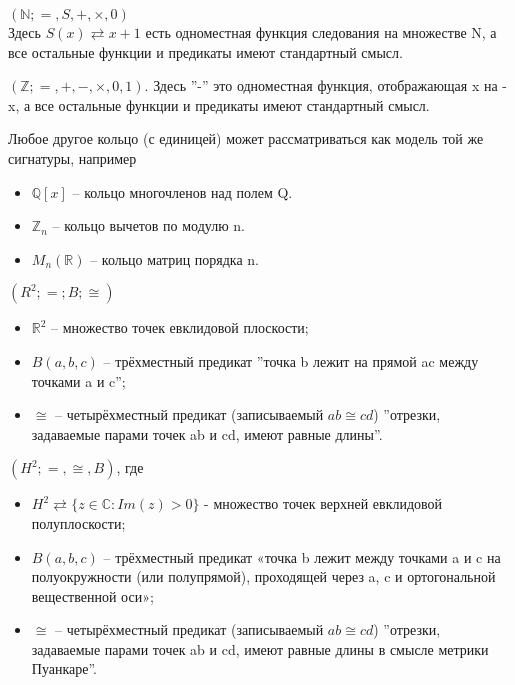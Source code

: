 \begin{example} 
	$(\mathbb{N}; =, S, +, \times, 0)$ \\
	Здесь $S(x) \rightleftarrows x+1 $ есть одноместная функция следования на множестве N,
	а все остальные функции и предикаты имеют стандартный смысл.
\end{example}

\begin{example} 
	$(\mathbb{Z}; =,+,-,\times,0,1)$. Здесь ''-'' это одноместная функция, отображающая x на -x, а все остальные
	функции и предикаты имеют стандартный смысл.
\end{example}

\begin{example} 
	Любое другое кольцо (с единицей) может рассматриваться как
	модель той же сигнатуры, например
	\begin{itemize}
		\item $\mathbb{Q}[x]$ -- кольцо многочленов над полем Q.
		\item $\mathbb{Z}_{n}$ -- кольцо вычетов по модулю n.
		\item $M_{n}(\mathbb{R})$ -- кольцо матриц порядка n.
	\end{itemize}
\end{example}

\begin{example}  $(R^{2};=;B;\cong)$
	\begin{itemize}
		\item $\mathbb{R}^2$ -- множество точек евклидовой плоскости;
		\item $B(a, b ,c)$ -- трёхместный предикат ''точка b лежит на прямой ac между точками a и c'';
		\item $\cong$ -- четырёхместный предикат (записываемый $ab \cong cd$) ''отрезки, задаваемые парами точек ab и
			cd, имеют равные длины''.
	\end{itemize}
\end{example}

\begin{example} 
	$(H^2; =,\cong, B)$, где
	\begin{itemize}
		\item $H^2 \rightleftarrows \{z \in \mathbb{C} : Im(z)>0 \}$ - множество точек верхней евклидовой полуплоскости;
		\item $B(a, b ,c)$ -- трёхместный предикат «точка b лежит между точками a и c на полуокружности (или полупрямой),
			проходящей через a, c и ортогональной вещественной оси»;
		\item $\cong$ -- четырёхместный предикат (записываемый $ab \cong cd$) ''отрезки, задаваемые парами точек ab и cd,
			имеют равные длины в смысле метрики Пуанкаре''.
	\end{itemize}
\end{example}
